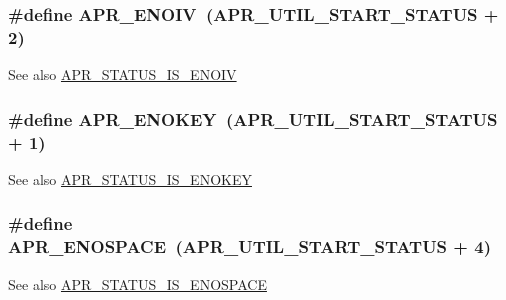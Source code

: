 \subsubsection[{\texorpdfstring{A\+P\+R\+\_\+\+E\+N\+O\+IV}{APR_ENOIV}}]{\setlength{\rightskip}{0pt plus 5cm}\#define A\+P\+R\+\_\+\+E\+N\+O\+IV~({\bf A\+P\+R\+\_\+\+U\+T\+I\+L\+\_\+\+S\+T\+A\+R\+T\+\_\+\+S\+T\+A\+T\+US} + 2)}\hypertarget{group__APR__Util__Error_ga2df3db3a80a6e153134caf5d3a62a00f}{}\label{group__APR__Util__Error_ga2df3db3a80a6e153134caf5d3a62a00f}
\begin{DoxySeeAlso}{See also}
\hyperlink{group__APR__Util__Error_ga5d6aa91dabbbaa71f11c293af460b143}{A\+P\+R\+\_\+\+S\+T\+A\+T\+U\+S\+\_\+\+I\+S\+\_\+\+E\+N\+O\+IV} 
\end{DoxySeeAlso}
\subsubsection[{\texorpdfstring{A\+P\+R\+\_\+\+E\+N\+O\+K\+EY}{APR_ENOKEY}}]{\setlength{\rightskip}{0pt plus 5cm}\#define A\+P\+R\+\_\+\+E\+N\+O\+K\+EY~({\bf A\+P\+R\+\_\+\+U\+T\+I\+L\+\_\+\+S\+T\+A\+R\+T\+\_\+\+S\+T\+A\+T\+US} + 1)}\hypertarget{group__APR__Util__Error_gabf9bbd463ebcf38611f6acd423e49de9}{}\label{group__APR__Util__Error_gabf9bbd463ebcf38611f6acd423e49de9}
\begin{DoxySeeAlso}{See also}
\hyperlink{group__APR__Util__Error_ga060055dd2eb82e8450015fa2fae5f87c}{A\+P\+R\+\_\+\+S\+T\+A\+T\+U\+S\+\_\+\+I\+S\+\_\+\+E\+N\+O\+K\+EY} 
\end{DoxySeeAlso}
\subsubsection[{\texorpdfstring{A\+P\+R\+\_\+\+E\+N\+O\+S\+P\+A\+CE}{APR_ENOSPACE}}]{\setlength{\rightskip}{0pt plus 5cm}\#define A\+P\+R\+\_\+\+E\+N\+O\+S\+P\+A\+CE~({\bf A\+P\+R\+\_\+\+U\+T\+I\+L\+\_\+\+S\+T\+A\+R\+T\+\_\+\+S\+T\+A\+T\+US} + 4)}\hypertarget{group__APR__Util__Error_gaec7a912cf8fe5f964ad8fbbafaff0241}{}\label{group__APR__Util__Error_gaec7a912cf8fe5f964ad8fbbafaff0241}
\begin{DoxySeeAlso}{See also}
\hyperlink{group__APR__Util__Error_ga32f4e4d4cff641d33acf3cb722e36b1f}{A\+P\+R\+\_\+\+S\+T\+A\+T\+U\+S\+\_\+\+I\+S\+\_\+\+E\+N\+O\+S\+P\+A\+CE} 
\end{DoxySeeAlso}
